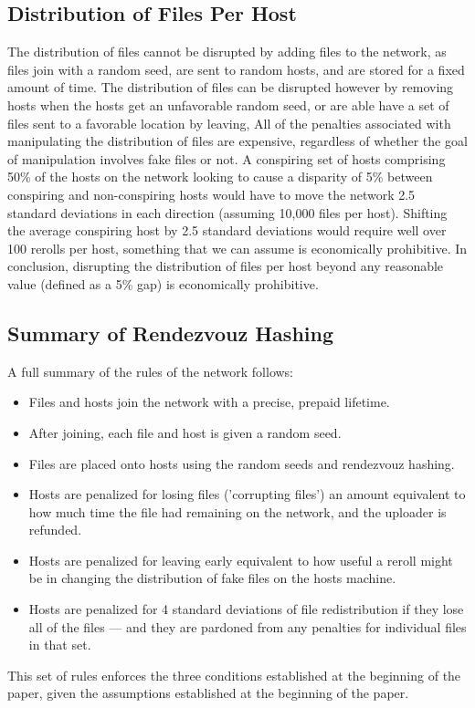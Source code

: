 \documentclass[twocolumn]{article}
\begin{document}
\subsection{Distribution of Files Per Host}
The distribution of files cannot be disrupted by adding files to the network, as files join with a random seed, are sent to random hosts, and are stored for a fixed amount of time.
The distribution of files can be disrupted however by removing hosts when the hosts get an unfavorable random seed, or are able have a set of files sent to a favorable location by leaving,
All of the penalties associated with manipulating the distribution of files are expensive, regardless of whether the goal of manipulation involves fake files or not.
A conspiring set of hosts comprising 50\% of the hosts on the network looking to cause a disparity of 5\% between conspiring and non-conspiring hosts would have to move the network 2.5 standard deviations in each direction (assuming 10,000 files per host).
Shifting the average conspiring host by 2.5 standard deviations would require well over 100 rerolls per host, something that we can assume is economically prohibitive.
In conclusion, disrupting the distribution of files per host beyond any reasonable value (defined as a 5\% gap) is economically prohibitive.

\subsection{Summary of Rendezvouz Hashing}
A full summary of the rules of the network follows:
\begin{itemize}
	\item Files and hosts join the network with a precise, prepaid lifetime.
	\item After joining, each file and host is given a random seed.
	\item Files are placed onto hosts using the random seeds and rendezvouz hashing.
	\item Hosts are penalized for losing files ('corrupting files') an amount equivalent to how much time the file had remaining on the network, and the uploader is refunded.
	\item Hosts are penalized for leaving early equivalent to how useful a reroll might be in changing the distribution of fake files on the hosts machine.
	\item Hosts are penalized for 4 standard deviations of file redistribution if they lose all of the files --- and they are pardoned from any penalties for individual files in that set.
\end{itemize}
This set of rules enforces the three conditions established at the beginning of the paper, given the assumptions established at the beginning of the paper.
\end{document}
